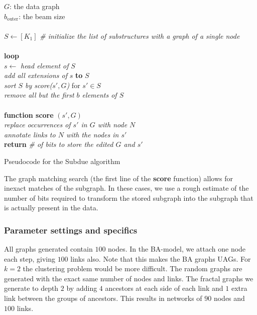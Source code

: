 \documentclass{article}
\begin{document}
\begin{pseudo}[h]
{
	$G$: the data graph \\
	$b_{\mbox{outer}}$: the beam size \\
	\\
	$S \leftarrow [K_1]$ \textit{\#  initialize the list of substructures with a graph of a single node} \\
	\\
	\textbf{loop} \\
	\hspace*{5mm} $s \leftarrow $ \textit{head element of} $S$ \\
	\hspace*{5mm} \textit{add all extensions of} $s$ \textbf{to} $S$ \\
	
	\hspace*{5mm}\textit{sort $S$ by score($s', G$)} for $s' \in S$\\
	\hspace*{5mm}\textit{remove all but the first $b$ elements of $S$} \\
	\\
	\textbf{function score} $(s', G)$\\
	\hspace*{5mm} \textit{replace occurrences of $s'$ in $G$ with node $N$}\\
	\hspace*{5mm} \textit{annotate links to $N$ with the nodes in $s'$}\\
	\hspace*{5mm} \textbf{return} \textit{\# of bits to store the edited $G$ and $s'$ }\\
}
	\caption{Pseudocode for the Subdue algorithm}
	
	\label{pseudo:algorithm}
\end{pseudo}

The graph matching search (the first line of the \textbf{score} function) allows for inexact matches of the subgraph. In these cases, we use a rough estimate of the number of bits required to transform the stored subgraph into the subgraph that is actually present in the data.

\subsubsection*{Parameter settings and specifics}

All graphs generated contain $100$ nodes. In the BA-model, we attach one node each step, giving $100$ links also. Note that this makes the BA graphs UAGs. For $k = 2$ the clustering problem would be more difficult. The random graphs are generated with the exact same number of nodes and links. The fractal graphs we generate to depth $2$ by adding $4$ ancestors at each side of each link and $1$ extra link between the groups of ancestors. This results in networks of $90$ nodes and $100$ links.
\end{document}
